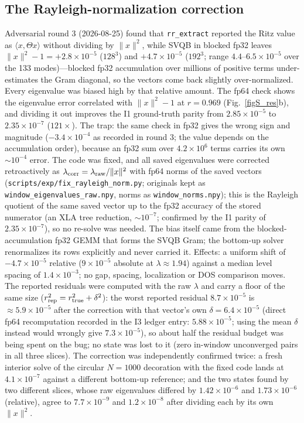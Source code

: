 \documentclass[aps,prl,preprint,superscriptaddress,longbibliography,nofootinbib]{revtex4-2}
\begin{document}
\subsection{The Rayleigh-normalization correction}\label{sec:rayleigh}
Adversarial round 3 (2026-08-25) found that \texttt{rr\_extract} reported the Ritz value as $\langle x,\Theta x\rangle$ without dividing by $\|x\|^2$, while SVQB in blocked fp32 leaves $\|x\|^2-1=+2.8\times10^{-5}$ ($128^3$) and $+4.7\times10^{-5}$ ($192^3$; range $4.4$--$6.5\times10^{-5}$ over the 133 modes)---blocked fp32 accumulation over millions of positive terms under-estimates the Gram diagonal, so the vectors come back slightly over-normalized. Every eigenvalue was biased high by that relative amount. The fp64 check shows the eigenvalue error correlated with $\|x\|^2-1$ at $r=0.969$ (Fig.~\ref{figS_res}b), and dividing it out improves the I1 ground-truth parity from $2.85\times10^{-5}$ to $2.35\times10^{-7}$ ($121\times$). The trap: the same check in fp32 gives the wrong sign and magnitude ($-3.4\times10^{-4}$ as recorded in round 3; the value depends on the accumulation order), because an fp32 sum over $4.2\times10^6$ terms carries its own $\sim10^{-4}$ error. The code was fixed, and all saved eigenvalues were corrected retroactively as $\lambda_{\rm corr}=\lambda_{\rm raw}/\|x\|^2$ with fp64 norms of the saved vectors (\texttt{scripts/exp/fix\_rayleigh\_norm.py}; originals kept as \texttt{window\_eigenvalues\_raw.npy}, norms as \texttt{window\_norms.npy}); this is the Rayleigh quotient of the same saved vector up to the fp32 accuracy of the stored numerator (an XLA tree reduction, $\sim10^{-7}$; confirmed by the I1 parity of $2.35\times10^{-7}$), so no re-solve was needed. The bias itself came from the blocked-accumulation fp32 GEMM that forms the SVQB Gram; the bottom-up solver renormalizes its rows explicitly and never carried it. Effects: a uniform shift of $-4.7\times10^{-5}$ relative ($9\times10^{-5}$ absolute at $\lambda\approx1.94$) against a median level spacing of $1.4\times10^{-3}$; no gap, spacing, localization or DOS comparison moves. The reported residuals were computed with the raw $\lambda$ and carry a floor of the same size ($r_{\rm rep}^2=r_{\rm true}^2+\delta^2$): the worst reported residual $8.7\times10^{-5}$ is $\approx5.9\times10^{-5}$ after the correction with that vector's own $\delta=6.4\times10^{-5}$ (direct fp64 recomputation recorded in the I3 ledger entry: $5.88\times10^{-5}$; using the mean $\delta$ instead would wrongly give $7.3\times10^{-5}$), so about half the residual budget was being spent on the bug; no state was lost to it (zero in-window unconverged pairs in all three slices). The correction was independently confirmed twice: a fresh interior solve of the circular $N=1000$ decoration with the fixed code lands at $4.1\times10^{-7}$ against a different bottom-up reference; and the two states found by two different slices, whose raw eigenvalues differed by $1.42\times10^{-6}$ and $1.73\times10^{-6}$ (relative), agree to $7.7\times10^{-9}$ and $1.2\times10^{-8}$ after dividing each by its own $\|x\|^2$.
\end{document}
